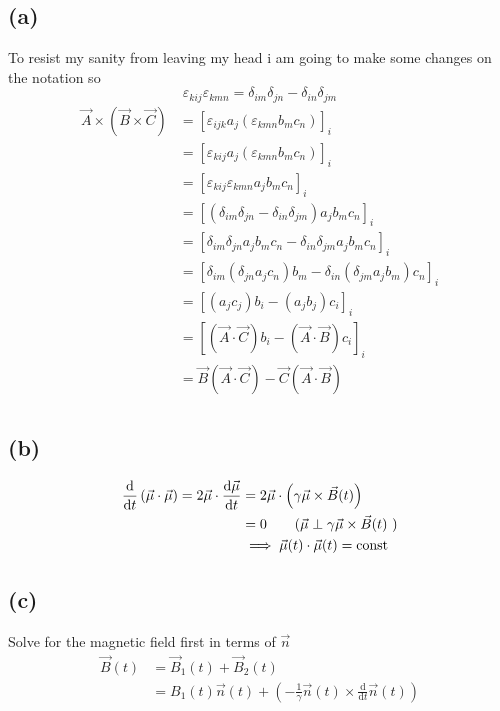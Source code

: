 \documentclass[letter, 10pts]{article}
\begin{document}
\subsection*{(a)}
To resist my sanity from leaving my head i am going to make some changes on the notation so 
\[
	\varepsilon_{kij} \varepsilon_{kmn} = \delta_{im} \delta _{jn} - \delta_{in} \delta_{jm} 
\] 
\begin{align*}
	\vec{A} \times (\vec{B} \times  \vec{C}) 
	&= [\varepsilon_{ijk} a_j (\varepsilon_{kmn} b_m c_n) ]_i \\ 
	&= [\varepsilon_{kij} a_j (\varepsilon_{kmn} b_m c_n) ]_i \\ 
	&= [\varepsilon_{kij} \varepsilon_{kmn} a_j b_m c_n ]_i \\ 
	&= [(\delta_{im} \delta_{jn} - \delta_{in} \delta_{jm} ) a_j b_m c_n ]_i \\ 
	&= [\delta_{im} \delta_{jn} a_j b_m c_n - \delta_{in} \delta_{jm}  a_j b_m c_n ]_i \\ 
	&= [\delta_{im} (\delta_{jn} a_j c_n) b_m  - \delta_{in} (\delta_{jm} a_j b_m) c_n ]_i \\ 
	&= [ (a_j c_j) b_i  - (a_j b_j) c_i ]_i \\  
	&= [ (\vec{A} \cdot \vec{C} ) b_i - (\vec{A} \cdot \vec{B}) c_i ] _i \\
	&= \vec{B} \left(\vec{A} \cdot \vec{C}\right) - \vec{C} \left(\vec{A} \cdot \vec{B}\right) \tag{taking sum over all component} \\ 
\end{align*}
\subsection*{(b)} 

\begin{align*} 
	\frac{\mathrm{d} }{\mathrm{d} t}\left(
	\vec{\mu} \cdot \vec{\mu}
	\right) = 
	2 {\vec{\mu}} \cdot  \frac{\mathrm{d} \vec{\mu}}{\mathrm{d} t} 
	&= 2 \vec{\mu} \cdot  \left(\gamma \vec{\mu} \times \vec{B}(t) \right)  \\ 
	&= 
	0 \tag{$\vec{\mu} \perp \gamma \vec{\mu} \times \vec{B}(t)$ }
	\\
	& \implies 
	\vec{\mu} (t) \cdot  \vec{\mu} (t) = \text{const}
\end{align*}


\subsection*{(c)}
Solve for the magnetic field first in terms of $\vec{n}$ 
\begin{align*}
	\vec{B}(t) &= \vec{B}_1 (t) + \vec{B}_2 (t) \\ 
	&= B_1(t) \vec{n}(t) + \left( - \frac{1}{\gamma} \vec{n} (t)\times \frac{\mathrm{d} }{\mathrm{d} t} \vec{n} (t)\right)
\end{align*}
\end{document}

